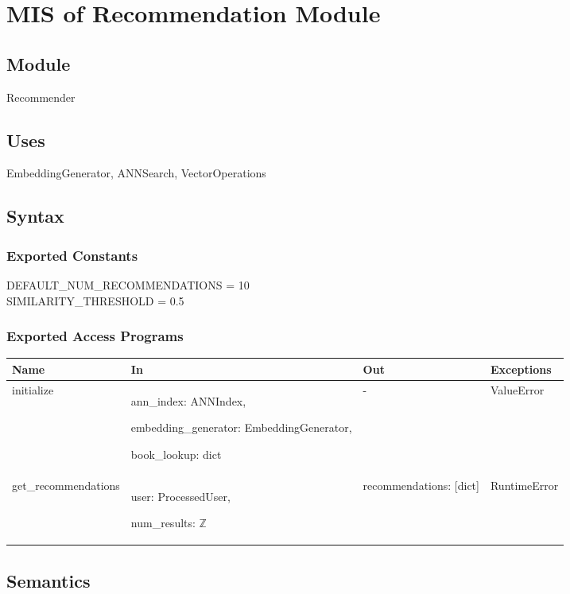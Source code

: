 \documentclass[12pt, titlepage]{article}
\begin{document}
\newpage

\section{MIS of Recommendation Module } \label{ModuleR}

\subsection{Module}

Recommender

\subsection{Uses}
EmbeddingGenerator, ANNSearch, VectorOperations

\subsection{Syntax}

\subsubsection{Exported Constants}
DEFAULT\_NUM\_RECOMMENDATIONS = 10\\
SIMILARITY\_THRESHOLD = 0.5
\subsubsection{Exported Access Programs}

\begin{center}
  \begin{tabular}{p{5cm} p{4cm} p{4cm} p{2cm}}
  \hline
  \textbf{Name} & \textbf{In} & \textbf{Out} & \textbf{Exceptions} \\
  \hline
  initialize & ann\_index: ANNIndex,
  
  embedding\_generator: EmbeddingGenerator,
  
  book\_lookup: dict & -& ValueError \\
  \hline
  get\_recommendations & user: ProcessedUser,
  
  num\_results: $\mathbb{Z}$ & recommendations: [dict] & RuntimeError \\
  \hline
  \end{tabular}
  \end{center}

\subsection{Semantics}
\end{document}
